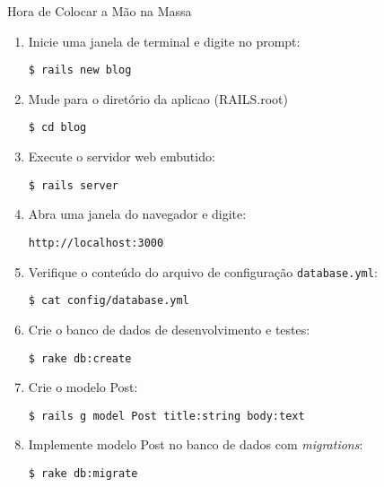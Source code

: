 \begin{frame}{Hora de Colocar a Mão na Massa}
	\begin{enumerate}
		\item Inicie uma janela de terminal e digite no prompt:
			\begin{lstlisting}[style=BashInputBasicStyle]
			$ rails new blog
			\end{lstlisting}

		\item Mude para o diretório da aplicao (RAILS.root)
			\begin{lstlisting}[style=BashInputBasicStyle]
			$ cd blog
			\end{lstlisting}

		\item Execute o servidor web embutido:
		\begin{lstlisting}[style=BashInputBasicStyle]
			$ rails server
		\end{lstlisting}
		
		\item Abra uma janela do navegador e digite:
		\begin{lstlisting}[style=BashInputBasicStyle]
			http://localhost:3000
		\end{lstlisting}

		\item Verifique o conteúdo do arquivo de configuração \verb|database.yml|:
		\begin{lstlisting}[style=BashInputBasicStyle]
			$ cat config/database.yml
		\end{lstlisting}

		\item Crie o banco de dados de desenvolvimento e testes:
		\begin{lstlisting}[style=BashInputBasicStyle]
			$ rake db:create
		\end{lstlisting}

		\item Crie o modelo Post:
		\begin{lstlisting}[style=BashInputBasicStyle]
			$ rails g model Post title:string body:text
		\end{lstlisting}

		\item Implemente modelo Post no banco de dados com {\it migrations}:
		\begin{lstlisting}[style=BashInputBasicStyle]
			$ rake db:migrate
		\end{lstlisting}


\end{enumerate}
\end{frame}
